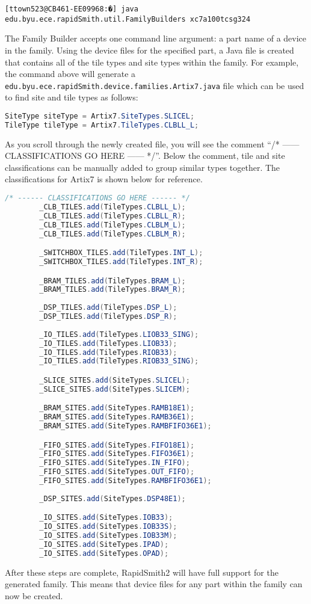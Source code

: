 \begin {enumerate}
\begin{lstlisting}[numbers=none]
[ttown523@CB461-EE09968:�] java edu.byu.ece.rapidSmith.util.FamilyBuilders xc7a100tcsg324
\end{lstlisting}

	\noindent The Family Builder accepts one command line argument: a part name of
	a device in the family. Using the device files for the specified part, a Java
	file is created that contains all of the tile types and site types within
	the family. For example, the command above will generate a
	\texttt{edu.byu.ece.rapidSmith.device.families.Artix7.java} file which can
	be used to find site and tile types as follows:
    
\begin{lstlisting}[language=java,numbers=none]
SiteType siteType = Artix7.SiteTypes.SLICEL;
TileType tileType = Artix7.TileTypes.CLBLL_L;
\end{lstlisting}

	\noindent As you scroll through the newly created file, you will see the
	comment ``/* ------ CLASSIFICATIONS GO HERE ------ */''. Below the comment,
	tile and site classifications can be manually added to group similar types
	together. The classifications for Artix7 is shown below for reference.  

\begin{lstlisting}[language=java,numbers=none]
 /* ------ CLASSIFICATIONS GO HERE ------ */
        _CLB_TILES.add(TileTypes.CLBLL_L);
        _CLB_TILES.add(TileTypes.CLBLL_R);
        _CLB_TILES.add(TileTypes.CLBLM_L);
        _CLB_TILES.add(TileTypes.CLBLM_R);

        _SWITCHBOX_TILES.add(TileTypes.INT_L);
        _SWITCHBOX_TILES.add(TileTypes.INT_R);

        _BRAM_TILES.add(TileTypes.BRAM_L);
        _BRAM_TILES.add(TileTypes.BRAM_R);
	
        _DSP_TILES.add(TileTypes.DSP_L);
        _DSP_TILES.add(TileTypes.DSP_R);
	
        _IO_TILES.add(TileTypes.LIOB33_SING);
        _IO_TILES.add(TileTypes.LIOB33);
        _IO_TILES.add(TileTypes.RIOB33);
        _IO_TILES.add(TileTypes.RIOB33_SING);

        _SLICE_SITES.add(SiteTypes.SLICEL);
        _SLICE_SITES.add(SiteTypes.SLICEM);

        _BRAM_SITES.add(SiteTypes.RAMB18E1);
        _BRAM_SITES.add(SiteTypes.RAMB36E1);
        _BRAM_SITES.add(SiteTypes.RAMBFIFO36E1);

        _FIFO_SITES.add(SiteTypes.FIFO18E1);
        _FIFO_SITES.add(SiteTypes.FIFO36E1);
        _FIFO_SITES.add(SiteTypes.IN_FIFO);
        _FIFO_SITES.add(SiteTypes.OUT_FIFO);
        _FIFO_SITES.add(SiteTypes.RAMBFIFO36E1);
        
        _DSP_SITES.add(SiteTypes.DSP48E1);

        _IO_SITES.add(SiteTypes.IOB33);
        _IO_SITES.add(SiteTypes.IOB33S);
        _IO_SITES.add(SiteTypes.IOB33M);
        _IO_SITES.add(SiteTypes.IPAD);
        _IO_SITES.add(SiteTypes.OPAD);
\end{lstlisting}

\end{enumerate}


\noindent After these steps are complete, RapidSmith2 will have full support for
the generated family. This means that device files for any part within the
family can now be created.
 
